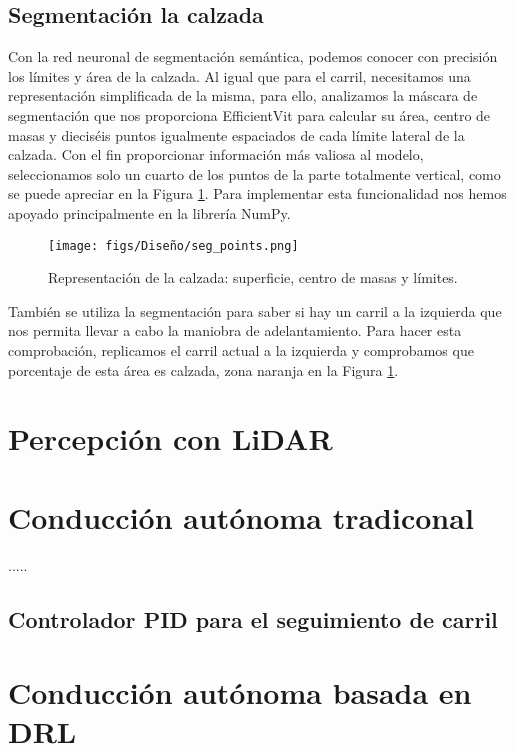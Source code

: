 \subsection{Segmentación la calzada}

Con la red neuronal de segmentación semántica, podemos conocer con precisión los límites y área de la calzada. Al igual que para el carril, necesitamos una representación simplificada de la misma, para ello, analizamos la máscara de segmentación que nos proporciona EfficientVit para calcular su área, centro de masas y dieciséis puntos igualmente espaciados de cada límite lateral de la calzada. Con el fin proporcionar información más valiosa al modelo, seleccionamos solo un cuarto de los puntos de la parte totalmente vertical, como se puede apreciar en la Figura \ref{fig:seg_params}. Para implementar esta funcionalidad nos hemos apoyado principalmente en la librería NumPy.

\begin{figure}[ht]
  \centering
  \texttt{[image: figs/Diseño/seg\_points.png]}
  \caption{Representación de la calzada: superficie, centro de masas y límites.}
  \label{fig:seg_params}
\end{figure}

También se utiliza la segmentación para saber si hay un carril a la izquierda que nos permita llevar a cabo la maniobra de adelantamiento. Para hacer esta comprobación, replicamos el carril actual a la izquierda y comprobamos que porcentaje de esta área es calzada, zona naranja en la Figura \ref{fig:seg_params}.

\section{Percepción con \ac{LiDAR}}

\section{Conducción autónoma tradiconal}
.....
\subsection{Controlador \ac{PID} para el seguimiento de carril}

\section{Conducción autónoma basada en \ac{DRL}}

